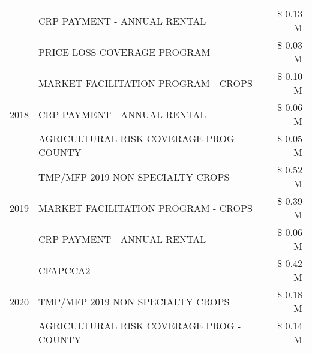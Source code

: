 \begin{tabular}{llr}
 & CRP PAYMENT - ANNUAL RENTAL & \$ 0.13 M \\
 & PRICE LOSS COVERAGE PROGRAM & \$ 0.03 M \\
\cline{1-3}
\multirow[t]{3}{*}{2018} & MARKET FACILITATION PROGRAM - CROPS & \$ 0.10 M \\
 & CRP PAYMENT - ANNUAL RENTAL & \$ 0.06 M \\
 & AGRICULTURAL RISK COVERAGE PROG - COUNTY & \$ 0.05 M \\
\cline{1-3}
\multirow[t]{3}{*}{2019} & TMP/MFP 2019 NON SPECIALTY CROPS & \$ 0.52 M \\
 & MARKET FACILITATION PROGRAM - CROPS & \$ 0.39 M \\
 & CRP PAYMENT - ANNUAL RENTAL & \$ 0.06 M \\
\cline{1-3}
\multirow[t]{3}{*}{2020} & CFAPCCA2 & \$ 0.42 M \\
 & TMP/MFP 2019 NON SPECIALTY CROPS & \$ 0.18 M \\
 & AGRICULTURAL RISK COVERAGE PROG - COUNTY & \$ 0.14 M \\
\cline{1-3}
\bottomrule
\end{tabular}
